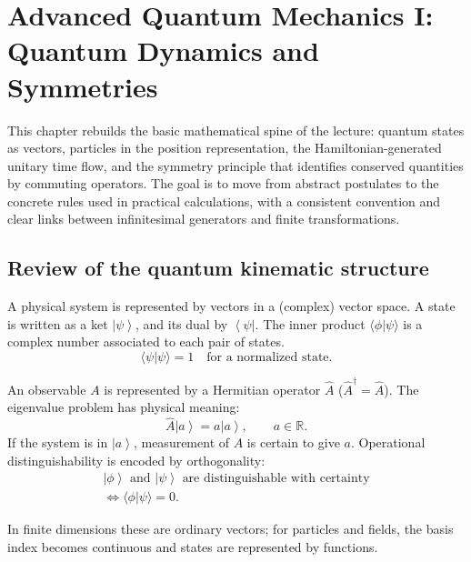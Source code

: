 \chapter{Advanced Quantum Mechanics I: Quantum Dynamics and Symmetries}
\providecommand{\ket}[1]{\left\lvert#1\right\rangle}
\providecommand{\bra}[1]{\left\langle#1\right\rvert}

This chapter rebuilds the basic mathematical spine of the lecture: quantum states as vectors, particles in the position representation, the Hamiltonian-generated unitary time flow, and the symmetry principle that identifies conserved quantities by commuting operators. The goal is to move from abstract postulates to the concrete rules used in practical calculations, with a consistent convention and clear links between infinitesimal generators and finite transformations.

\section{Review of the quantum kinematic structure}

A physical system is represented by vectors in a (complex) vector space. A state is written as a ket \(\ket\psi\), and its dual by \(\bra\psi\). The inner product \(\langle\phi|\psi\rangle\) is a complex number associated to each pair of states.  
\begin{equation}
\langle\psi|\psi\rangle=1 \quad \text{for a normalized state}.
\end{equation}

An observable \(A\) is represented by a Hermitian operator \(\hat A\) (\(\hat A^\dagger=\hat A\)). The eigenvalue problem has physical meaning:
\begin{equation}
\hat A\ket{a} = a\ket{a},\qquad a\in\mathbb R.
\end{equation}
If the system is in \(\ket a\), measurement of \(A\) is certain to give \(a\).  
Operational distinguishability is encoded by orthogonality:
\begin{equation}
\begin{aligned}
\ket\phi\text{ and }\ket\psi\text{ are distinguishable with certainty}
\\
\Longleftrightarrow \langle\phi|\psi\rangle=0.
\end{aligned}
\end{equation}

In finite dimensions these are ordinary vectors; for particles and fields, the basis index becomes continuous and states are represented by functions.

